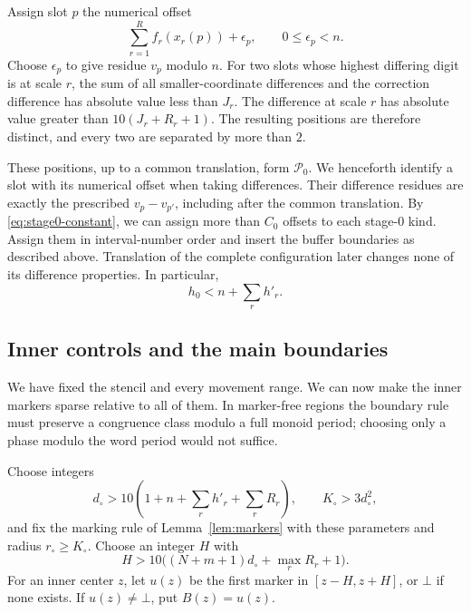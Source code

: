 Assign slot $p$ the numerical offset
\begin{equation}\label{eq:slot-position}
                   \sum_{r=1}^R f_r(x_r(p))+\epsilon_p,
             \qquad 0\leq\epsilon_p<n.
\end{equation}
Choose $\epsilon_p$ to give residue $v_p$ modulo $n$.
For two slots whose highest differing digit is at scale $r$, the sum
of all smaller-coordinate differences and the correction difference
has absolute value less than $J_r$.  The difference at scale $r$
has absolute value greater than $10(J_r+R_r+1)$.  The resulting
positions are therefore distinct, and every two are separated by
more than $2$.

These positions, up to a common translation, form $\mathcal P_0$.
We henceforth identify a slot with its numerical offset when taking
differences.  Their difference residues are exactly the prescribed
$v_p-v_{p'}$, including after the common translation.  By
\eqref{eq:stage0-constant}, we can assign more than $C_0$ offsets to
each stage-$0$ kind.  Assign them in interval-number order and insert
the buffer boundaries as described above.  Translation of the complete
configuration later changes none of its difference properties.  In
particular,
\begin{equation}\label{eq:stage0-diameter}
                         h_0<n+\sum_r h'_r.
\end{equation}

\subsection{Inner controls and the main boundaries}

We have fixed the stencil and every movement range. We can now make the
inner markers sparse relative to all of them. In marker-free regions the
boundary rule must preserve a congruence class modulo a full monoid period;
choosing only a phase modulo the word period would not suffice.

Choose integers
\begin{equation}\label{eq:inner-marker-size}
 d_\circ>10\left(1+n+\sum_r h'_r+\sum_r R_r\right),
 \qquad K_\circ>3d_\circ^2,
\end{equation}
and fix the marking rule of Lemma~\ref{lem:markers} with these
parameters and radius $r_\circ\geq K_\circ$.  Choose an integer $H$ with
\begin{equation}\label{eq:inner-halfwidth}
             H>10\bigl((N+m+1)d_\circ+\max_r R_r+1\bigr).
\end{equation}
For an inner center $z$, let $u(z)$ be the first marker in
$[z-H,z+H]$, or $\bot$ if none exists.  If $u(z)\neq\bot$, put
$B(z)=u(z)$.

